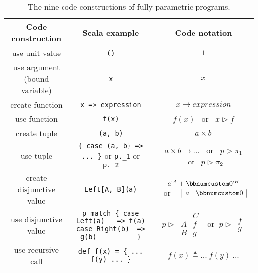 \begin{table}
\begin{centering}
\begin{tabular}{|c|c|c|}
\hline 
\textbf{\small{}Code construction} & \textbf{\small{}Scala example} & \textbf{\small{}Code notation}\tabularnewline
\hline 
\hline 
{\small{}use unit value} & {\small{}}\lstinline!()! & {\small{}$1$}\tabularnewline
\hline 
{\small{}use argument (bound variable)} & {\small{}}\lstinline!x! & {\small{}$x$}\tabularnewline
\hline 
{\small{}create function} & {\small{}}\lstinline!x => expression! & {\small{}$x\rightarrow expression$}\tabularnewline
\hline 
{\small{}use function} & {\small{}}\lstinline!f(x)! & $f(x)$ ~or~ $x\triangleright f$\tabularnewline
\hline 
{\small{}create tuple} & {\small{}}\lstinline!(a, b)! & {\small{}$a\times b$}\tabularnewline
\hline 
{\small{}use tuple} & {\small{}}\lstinline!{ case (a, b) => ... }!{\small{} or }\lstinline!p._1!{\small{}
or }\lstinline!p._2!{\small{} } & {\small{}$a\times b\rightarrow...$ ~or~ $p\triangleright\pi_{1}$
~or~ $p\triangleright\pi_{2}$}\tabularnewline
\hline 
{\small{}create disjunctive value} & {\small{}}\lstinline!Left[A, B](a)! & {\small{}}%
\begin{minipage}[c]{0.19\columnwidth}%
{\small{}\vspace{0.2\baselineskip}
$a^{:A}+\bbnum 0^{:B}$ ~or~~ $\begin{array}{|cc|}
a & \bbnum 0\end{array}$\vspace{0.2\baselineskip}
}%
\end{minipage}\tabularnewline
\hline 
{\small{}use disjunctive value} & {\small{}}%
\begin{minipage}[c]{0.33\columnwidth}%
{\small{}}\lstinline!p match { case Left(a)   => f(a)            case Right(b)  => g(b)          }!%
\end{minipage} & {\small{}}%
\begin{minipage}[c]{0.23\columnwidth}%
{\small{}\vspace{0.2\baselineskip}
$p\triangleright\,\begin{array}{|c||c|}
 & C\\
\hline A & f\\
B & g
\end{array}\,~\text{ or }~p\triangleright\,\begin{array}{||c|}
f\\
g
\end{array}$\vspace{0.2\baselineskip}
}%
\end{minipage}\tabularnewline
\hline 
{\small{}use recursive call} & {\small{}}\lstinline!def f(x) = { ... f(y) ... }! & {\small{}$f(x)\triangleq...~\overline{f}(y)~...$}\tabularnewline
\hline 
\end{tabular}
\par\end{centering}
\caption{The nine code constructions
of fully parametric programs.\label{tab:nine-pure-code-constructions}}
\end{table}

